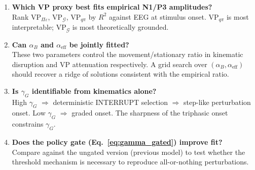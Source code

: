 \documentclass[11pt, a4paper]{article}
\newcommand{\EFE}{\mathcal{G}}
\begin{document}
\begin{enumerate}[leftmargin=*,label=\textbf{Q\arabic*.}]
  \item \textbf{Which VP proxy best fits empirical N1/P3 amplitudes?}\\
    Rank $\mathrm{VP}_{\Pi\varepsilon}$, $\mathrm{VP}_{\EFE}$,
    $\mathrm{VP}_{q\pi}$ by $R^2$ against EEG at stimulus onset.
    $\mathrm{VP}_{q\pi}$ is most interpretable;
    $\mathrm{VP}_{\EFE}$ is most theoretically grounded.

  \item \textbf{Can $\alpha_B$ and $\alpha_{\mathrm{eff}}$ be jointly fitted?}\\
    These two parameters control the movement/stationary ratio in
    kinematic disruption and VP attenuation respectively.
    A grid search over $(\alpha_B, \alpha_{\mathrm{eff}})$ should recover
    a ridge of solutions consistent with the empirical ratio.

  \item \textbf{Is $\gamma_G$ identifiable from kinematics alone?}\\
    High $\gamma_G$ $\Rightarrow$ deterministic INTERRUPT selection $\Rightarrow$
    step-like perturbation onset. Low $\gamma_G$ $\Rightarrow$ graded onset.
    The sharpness of the triphasic onset constrains $\gamma_G$.

  \item \textbf{Does the policy gate (Eq.~\ref{eq:gamma_gated}) improve fit?}\\
    Compare against the ungated version (previous model) to test whether
    the threshold mechanism is necessary to reproduce all-or-nothing
    perturbations.
\end{enumerate}
\end{document}
